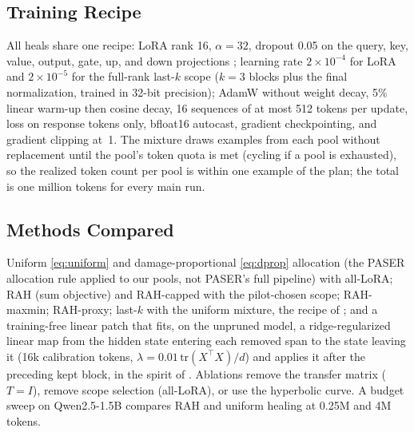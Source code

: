 \documentclass{ieeeaccess}
\newcommand{\RAH}{RAH}
\begin{document}
\begin{table}[t]
\caption{Healing pools and teacher-data yield per family: examples kept after quality control (and the fraction of prompts whose teacher output passed the check).}
\label{tab:pools}
\centering\footnotesize
\resizebox{\textwidth}{!}{}
\end{table}

\subsection{Training Recipe}
All heals share one recipe: LoRA rank 16, $\alpha = 32$, dropout 0.05 on the query, key, value, output, gate, up, and down projections \cite{hu2022lora,mangrulkar2022peft}; learning rate $2\times10^{-4}$ for LoRA and $2\times10^{-5}$ for the full-rank last-$k$ scope ($k = 3$ blocks plus the final normalization, trained in 32-bit precision); AdamW without weight decay, 5\% linear warm-up then cosine decay, 16 sequences of at most 512 tokens per update, loss on response tokens only, bfloat16 autocast, gradient checkpointing, and gradient clipping at~1. The mixture draws examples from each pool without replacement until the pool's token quota is met (cycling if a pool is exhausted), so the realized token count per pool is within one example of the plan; the total is one million tokens for every main run.

\subsection{Methods Compared}
Uniform \eqref{eq:uniform} and damage-proportional \eqref{eq:dprop} allocation (the PASER allocation rule applied to our pools, not PASER's full pipeline) with all-LoRA; \RAH{} (sum objective) and \RAH-capped with the pilot-chosen scope; \RAH-maxmin; \RAH-proxy; last-$k$ with the uniform mixture, the recipe of \cite{lu2024reassessing}; and a training-free linear patch that fits, on the unpruned model, a ridge-regularized linear map from the hidden state entering each removed span to the state leaving it (16k calibration tokens, $\lambda = 0.01\,\mathrm{tr}(X^{\top}X)/d$) and applies it after the preceding kept block, in the spirit of \cite{linearpatch2025,ghosted2026}. Ablations remove the transfer matrix ($T = I$), remove scope selection (all-LoRA), or use the hyperbolic curve. A budget sweep on Qwen2.5-1.5B compares \RAH{} and uniform healing at 0.25M and 4M tokens.
\end{document}
